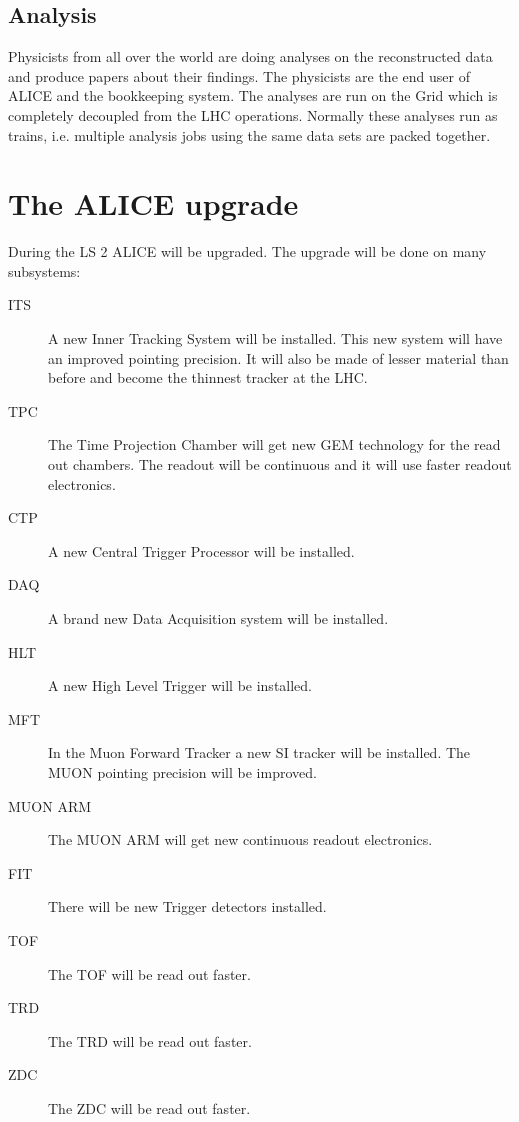 \subsection{Analysis}
Physicists from all over the world are doing analyses on the reconstructed data and produce papers about their findings. The physicists are the end user of ALICE and the bookkeeping system. The analyses are run on the Grid which is completely decoupled from the LHC operations. Normally these analyses run as trains, i.e. multiple analysis jobs using the same data sets are packed together.



\section{The ALICE upgrade}
During the LS 2 ALICE will be upgraded. The upgrade will be done on many subsystems:
\begin{description}
  \item[ITS] A new Inner Tracking System will be installed. This new system will have an improved pointing precision. It will also be made of lesser material than before and become the thinnest tracker at the LHC.
  \item[TPC] The Time Projection Chamber will get new GEM technology for the read out chambers. The readout will be continuous and it will use faster readout electronics.
  \item[CTP] A new Central Trigger Processor will be installed.
  \item[DAQ] A brand new Data Acquisition system will be installed.
  \item[HLT] A new High Level Trigger will be installed.
  \item[MFT] In the Muon Forward Tracker a new SI tracker will be installed. The MUON pointing precision will be improved.
  \item[MUON ARM] The MUON ARM will get new continuous readout electronics.
  \item[FIT] There will be new Trigger detectors installed.
  \item[TOF] The TOF will be read out faster.
  \item[TRD] The TRD will be read out faster.
  \item[ZDC] The ZDC will be read out faster.
\end{description}

